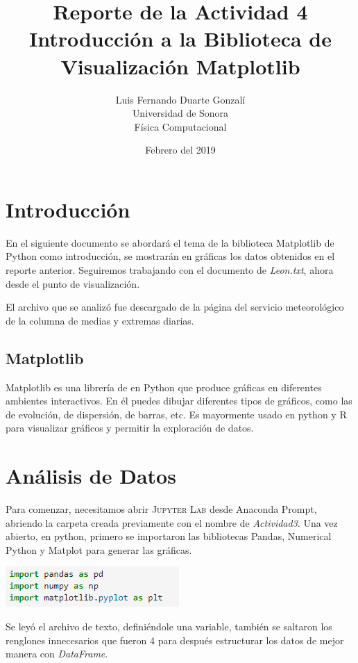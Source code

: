\documentclass{article}
\title{\textbf{Reporte de la Actividad 4}\\ Introducción a la Biblioteca de Visualización Matplotlib}
\author{Luis Fernando Duarte Gonzalí \\ Universidad de Sonora \\ Física Computacional}
\date{Febrero del 2019}
\begin{document}
\maketitle


\section{Introducción}
\noindent En el siguiente documento se abordará el tema de la biblioteca Matplotlib de Python como introducción, se mostrarán en gráficas los datos obtenidos en el reporte anterior. Seguiremos trabajando con el documento de \textit{Leon.txt}, ahora desde el punto de visualización.

El archivo que se analizó fue descargado de la página del servicio meteorológico de la columna de medias y extremas diarias.

\subsection{Matplotlib}
\noindent Matplotlib es una librería de en Python que produce gráficas en diferentes ambientes interactivos. En él puedes dibujar diferentes tipos de gráficos, como las de evolución, de dispersión, de barras, etc. Es mayormente usado en python y R para visualizar gráficos y permitir la exploración de datos.

\section{Análisis de Datos}

\noindent Para comenzar, necesitamos abrir \textsc{Jupyter Lab} desde Anaconda Prompt, abriendo la carpeta creada previamente con el nombre de \textit{Actividad3}.
Una vez abierto, en python, primero se importaron las bibliotecas Pandas, Numerical Python y Matplot para generar las gráficas.

\begin{center}
    \includegraphics[scale = 1]{Librerias.png}
\end{center}

\noindent Se leyó el archivo de texto, definiéndole una variable, también se saltaron los renglones innecesarios que fueron 4 para después estructurar los datos de mejor manera con \textit{DataFrame}.
\end{document}
